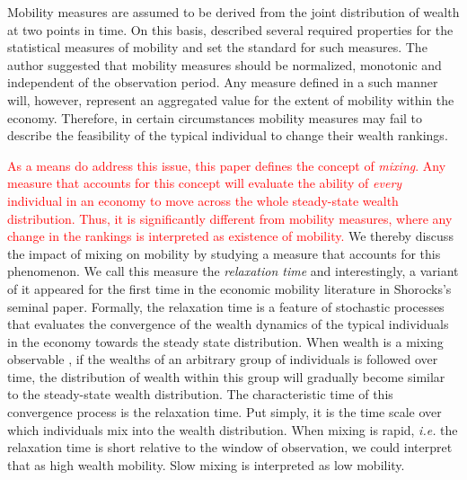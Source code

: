 \documentclass[11pt]{article}
\newcommand{\blue}[1]{{\color{blue} #1}}
\newcommand{\ie}{{\it i.e.}\xspace}
\newcommand{\YB}[1]{\blue{{\it YB: #1 YB}}}
\numberwithin{equation}{section}
\begin{document}
Mobility measures are assumed to be derived from the joint distribution of wealth at two points in time. On this basis, \citet{Shorrocks1978} described several required properties for the statistical measures of mobility and set the standard for such measures. The author suggested that mobility measures should be normalized, monotonic and independent of the observation period. Any measure defined in a such manner will, however, represent an aggregated value for the extent of mobility within the economy. Therefore, in certain circumstances mobility measures may fail to describe the feasibility of the typical individual to change their wealth rankings.


\textcolor{red}{As a means do address this issue, this paper defines the concept of \textit{mixing}. Any measure that accounts for this concept will evaluate the ability of \textit{every} individual in an economy to move across the whole steady-state wealth distribution. Thus, it is significantly different from mobility measures, where any change in the rankings is interpreted as existence of mobility.} We thereby discuss the impact of mixing on mobility by studying a measure that accounts for this phenomenon. We call this measure the \textit{relaxation time} and interestingly, a variant of it appeared for the first time in the economic mobility literature in Shorocks's seminal paper. Formally, the relaxation time is a feature of stochastic processes that evaluates the convergence of the wealth dynamics of the typical individuals in the economy towards the steady state distribution. When wealth is a mixing observable \citep{PetersAdamou2018c}, if the wealths of an arbitrary group of individuals is followed over time, the distribution of wealth within this group will gradually become similar to the steady-state wealth distribution. The characteristic time of this convergence process is the relaxation time. Put simply, it is the time scale over which individuals mix into the wealth distribution. When mixing is rapid, \ie the relaxation time is short relative to the window of observation, we could interpret that as high wealth mobility. Slow mixing is interpreted as low mobility.
\end{document}
